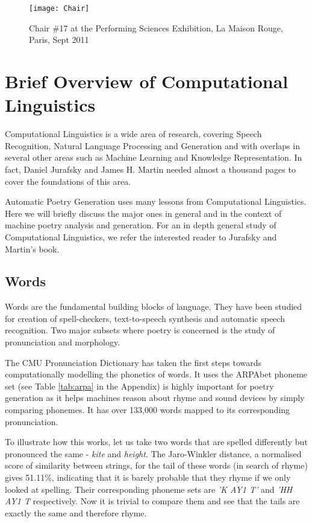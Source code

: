 \begin{figure}[h!]
\centering
\texttt{[image: Chair]}
\caption{Chair \#17 at the Performing Sciences Exhibition, La Maison Rouge, Paris, Sept 2011}
\label{fig:chair}
\end{figure}

\section{Brief Overview of Computational Linguistics}
Computational Linguistics is a wide area of research, covering Speech Recognition, Natural Language Processing and Generation and with overlaps in several other areas such as Machine Learning and Knowledge Representation. In fact, Daniel Jurafsky and James H. Martin needed almost a thousand pages to cover the foundations of this area\cite{jurafsky2000speech}.

Automatic Poetry Generation uses many lessons from Computational Linguistics. Here we will briefly discuss the major ones in general and in the context of machine poetry analysis and generation. For an in depth general study of Computational Linguistics, we refer the interested reader to Jurafsky and Martin's book.

\subsection{Words}
\label{sec:words}
Words are the fundamental building blocks of language. They have been studied for creation of spell-checkers, text-to-speech synthesis and automatic speech recognition. Two major subsets where poetry is concerned is the study of pronunciation and morphology. 

The CMU Pronunciation Dictionary\cite{weide1998cmu} has taken the first steps towards computationally modelling the phonetics of words. It uses the ARPAbet phoneme set (see Table \ref{tab:arpa} in the Appendix) is highly important for poetry generation as it helps machines reason about rhyme and sound devices by simply comparing phonemes. It has over 133,000 words mapped to its corresponding pronunciation.

To illustrate how this works, let us take two words that are spelled differently but pronounced the same - \textit{kite} and \textit{height}. The Jaro-Winkler distance, a normalised score of similarity between strings, for the tail of these words (in search of rhyme) gives 51.11\%, indicating that it is barely probable that they rhyme if we only looked at spelling. Their corresponding phoneme sets are \textit{'K AY1 T'} and \textit{'HH AY1 T} respectively. Now it is trivial to compare them and see that the tails are exactly the same and therefore rhyme.

